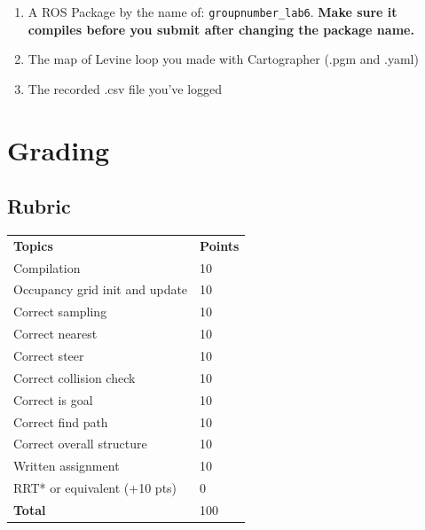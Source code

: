 \documentclass[letta4 paper]{article}
\numberwithin{equation}{section}
\newcommand{\0}{\mathbf{0}}
\begin{document}
	\begin{enumerate}
		\item A ROS Package by the name of: \texttt{groupnumber\_lab6}. \textbf{Make sure it compiles before you submit after changing the package name.}
		\item The map of Levine loop you made with Cartographer (.pgm and .yaml)
		\item The recorded .csv file you’ve logged
	\end{enumerate}

	\section{Grading}
	
	\subsection{Rubric}
	\begin{table}[h]
		\begin{tabular}{ll}
			\textbf{Topics} & \textbf{Points} \\
				Compilation	& 10 \\
				Occupancy grid init and update &	10 \\
				Correct sampling &	10 \\
				Correct nearest	& 10 \\
				Correct steer &	10 \\
				Correct collision check &	10 \\
				Correct is goal	& 10 \\
				Correct find path &	10 \\
				Correct overall structure &	10 \\
				Written assignment &	10 \\
				RRT* or equivalent (+10 pts) &	0 \\
			\textbf{Total} & 100 \\
		\end{tabular}
	\end{table}
	

	
			
\end{document}
